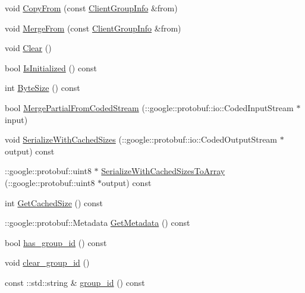 \begin{DoxyCompactItemize}
void \hyperlink{class_i_m_1_1_base_define_1_1_client_group_info_a083ecb8c1e1a6caac6df1e2dd4f8f58d}{Copy\+From} (const \hyperlink{class_i_m_1_1_base_define_1_1_client_group_info}{Client\+Group\+Info} \&from)
\item 
void \hyperlink{class_i_m_1_1_base_define_1_1_client_group_info_adba5bc664f084cbbfb66c8ac36dc895c}{Merge\+From} (const \hyperlink{class_i_m_1_1_base_define_1_1_client_group_info}{Client\+Group\+Info} \&from)
\item 
void \hyperlink{class_i_m_1_1_base_define_1_1_client_group_info_ab5705a6b2152d68cc75c7114c57037ae}{Clear} ()
\item 
bool \hyperlink{class_i_m_1_1_base_define_1_1_client_group_info_a444d5d2f80b275069d7be4528606cb12}{Is\+Initialized} () const 
\item 
int \hyperlink{class_i_m_1_1_base_define_1_1_client_group_info_a3663ffaa333b42f84b9b2a4d39a0282a}{Byte\+Size} () const 
\item 
bool \hyperlink{class_i_m_1_1_base_define_1_1_client_group_info_a5537aa1ff6d9be5d3b75e4942ba7df4b}{Merge\+Partial\+From\+Coded\+Stream} (\+::google\+::protobuf\+::io\+::\+Coded\+Input\+Stream $\ast$input)
\item 
void \hyperlink{class_i_m_1_1_base_define_1_1_client_group_info_acf28e51294802911078ebb78f85c2aef}{Serialize\+With\+Cached\+Sizes} (\+::google\+::protobuf\+::io\+::\+Coded\+Output\+Stream $\ast$output) const 
\item 
\+::google\+::protobuf\+::uint8 $\ast$ \hyperlink{class_i_m_1_1_base_define_1_1_client_group_info_ad5caae4c4a9b4386281417913c0a053f}{Serialize\+With\+Cached\+Sizes\+To\+Array} (\+::google\+::protobuf\+::uint8 $\ast$output) const 
\item 
int \hyperlink{class_i_m_1_1_base_define_1_1_client_group_info_ab8f13f712fdefc4c394f43188b57e926}{Get\+Cached\+Size} () const 
\item 
\+::google\+::protobuf\+::\+Metadata \hyperlink{class_i_m_1_1_base_define_1_1_client_group_info_a6ab04b35e306e5e989c2a390c2191205}{Get\+Metadata} () const 
\item 
bool \hyperlink{class_i_m_1_1_base_define_1_1_client_group_info_a54674c4914dda80072c992aef6255aa7}{has\+\_\+group\+\_\+id} () const 
\item 
void \hyperlink{class_i_m_1_1_base_define_1_1_client_group_info_a381662e7d0de07a4a9ae7a2c6372747e}{clear\+\_\+group\+\_\+id} ()
\item 
const \+::std\+::string \& \hyperlink{class_i_m_1_1_base_define_1_1_client_group_info_af803ccefa3b9c1e5ab16463f3eb9651e}{group\+\_\+id} () const 

\end{DoxyCompactItemize}
